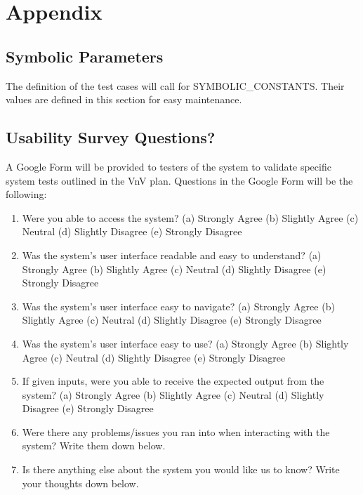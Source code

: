 \documentclass[12pt, titlepage]{article}
\begin{document}
\newpage

\section{Appendix}

\subsection{Symbolic Parameters}

The definition of the test cases will call for SYMBOLIC\_CONSTANTS.
Their values are defined in this section for easy maintenance.

\subsection{Usability Survey Questions?}

A Google Form will be provided to testers of the system to validate specific
system tests outlined in the VnV plan. Questions in the Google Form will be
the following:

\begin{enumerate}
  \item Were you able to access the system?
  \subitem (a) Strongly Agree
  \subitem (b) Slightly Agree
  \subitem (c) Neutral
  \subitem (d) Slightly Disagree
  \subitem (e) Strongly Disagree
  \item Was the system's user interface readable and easy to understand?
  \subitem (a) Strongly Agree
  \subitem (b) Slightly Agree
  \subitem (c) Neutral
  \subitem (d) Slightly Disagree
  \subitem (e) Strongly Disagree
  \item Was the system's user interface easy to navigate?
  \subitem (a) Strongly Agree
  \subitem (b) Slightly Agree
  \subitem (c) Neutral
  \subitem (d) Slightly Disagree
  \subitem (e) Strongly Disagree
  \item Was the system's user interface easy to use?
  \subitem (a) Strongly Agree
  \subitem (b) Slightly Agree
  \subitem (c) Neutral
  \subitem (d) Slightly Disagree
  \subitem (e) Strongly Disagree
  \item If given inputs, were you able to receive the expected output from
  the system?
  \subitem (a) Strongly Agree
  \subitem (b) Slightly Agree
  \subitem (c) Neutral
  \subitem (d) Slightly Disagree
  \subitem (e) Strongly Disagree
  \item Were there any problems/issues you ran into when interacting with
  the system? Write them down below.
  \item Is there anything else about the system you would like us to know?
  Write your thoughts down below.
\end{enumerate}
\end{document}
